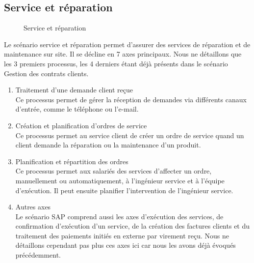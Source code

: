 \subsection{Service et réparation}

\begin{figure}[H]
    \label{fig-service-reparation}
    \noindent{}
    \caption{Service et réparation}
\end{figure}

Le scénario service et réparation permet d’assurer des services de réparation et de maintenance sur site. Il se décline en 7 axes principaux. Nous ne détaillons que les 3 premiers processus, les 4 derniers étant déjà présents dans le scénario Gestion des contrats clients. \\

\begin{enumerate}
\item Traitement d’une demande client reçue \\
Ce processus permet de gérer la réception de demandes via différents canaux d’entrée, comme le téléphone ou l’e-mail. \\

\item Création et planification d’ordres de service \\
Ce processus permet au service client de créer un ordre de service quand un client demande la réparation ou la maintenance d’un produit. \\

\item Planification et répartition des ordres \\
Ce processus permet aux salariés des services d’affecter un ordre, manuellement ou automatiquement, à l’ingénieur service et à l’équipe d’exécution. Il peut ensuite planifier l’intervention de l’ingénieur service. \\

\item Autres axes \\
Le scénario SAP comprend aussi les axes d’exécution des services, de confirmation d’exécution d’un service, de la création des factures clients et du traitement des paiements initiés en externe par virement reçu. Nous ne détaillons cependant pas plus ces axes ici car nous les avons déjà évoqués précédemment.
\end{enumerate}

